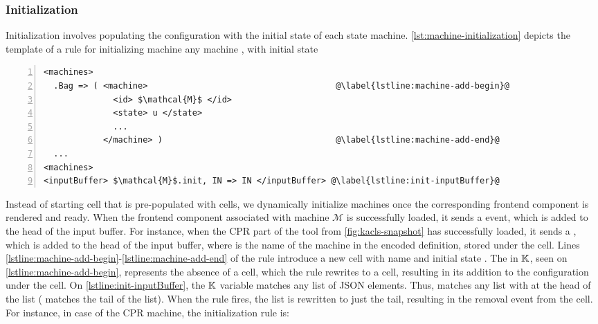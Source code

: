 \subsubsection{Initialization}

Initialization involves populating the configuration with the
initial state of each state machine. \autoref{lst:machine-initialization}
depicts the template of a rule for initializing machine
any machine , with initial state 


\begin{lstlisting}[float=ht,
  mathescape=true,
  frame=single,
  style=ksty,
  language=k,
  numbers=left,
  numbersep=5pt,
  caption={CPR Initialization},
  label={lst:machine-initialization},
  xleftmargin=3ex
  ]
<machines>
  .Bag => ( <machine>                                      @\label{lstline:machine-add-begin}@
              <id> $\mathcal{M}$ </id>
              <state> u </state>
              ...
            </machine> )                                   @\label{lstline:machine-add-end}@
  ...
<machines>
<inputBuffer> $\mathcal{M}$.init, IN => IN </inputBuffer> @\label{lstline:init-inputBuffer}@
\end{lstlisting}

Instead of starting  cell that is pre-populated with
 cells, we dynamically initialize
machines once the corresponding frontend component is rendered and ready.
When the frontend component associated with machine $\mathcal{M}$
is successfully loaded, it sends a  event,
which is added to the head of the input buffer.
For instance,  when the CPR part of the tool from
\autoref{fig:kacls-snapshot} has successfully loaded, it sends a ,
which is added to the head of the input buffer, where  is
the name of the machine in the encoded \K{} definition, stored under the  cell.
Lines \ref{lstline:machine-add-begin}-\ref{lstline:machine-add-end} of the rule
introduce a new  cell with name  and initial
state . The  in $\mathbb{K}$, seen on
\autoref{lstline:machine-add-begin}, represents the absence of a cell, which
the rule rewrites to a  cell, resulting in its
addition to the configuration under the  cell.
On \autoref{lstline:init-inputBuffer}, the $\mathbb{K}$ variable  matches any list of
JSON elements. Thus,  matches any list with
 at the head of the list ( matches the tail of
the list). When the rule fires, the list is rewritten to
just the tail, resulting in the removal 
event from the  cell. For instance, in case of the CPR
machine, the initialization rule is:

